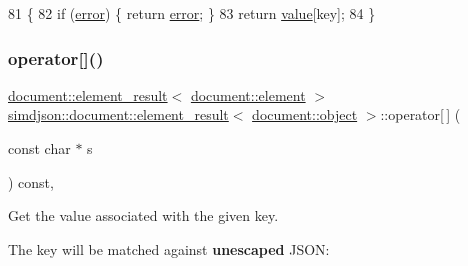\begin{DoxyCode}
81                                                                                                            
                                     \{
82   \textcolor{keywordflow}{if} (\hyperlink{classsimdjson_1_1document_1_1element__result_3_01document_1_1object_01_4_afb94302f28fe94b4eee922f4803abf86}{error}) \{ \textcolor{keywordflow}{return} \hyperlink{classsimdjson_1_1document_1_1element__result_3_01document_1_1object_01_4_afb94302f28fe94b4eee922f4803abf86}{error}; \}
83   \textcolor{keywordflow}{return} \hyperlink{classsimdjson_1_1document_1_1element__result_3_01document_1_1object_01_4_a65174f23d014d2e7d6ed87f42b60045a}{value}[key];
84 \}
\end{DoxyCode}
\mbox{\label{classsimdjson_1_1document_1_1element__result_3_01document_1_1object_01_4_a659bd57996f58b8c32278f07b7447266}} 
\subsubsection{\texorpdfstring{operator[]()}{operator[]()}\hspace{0.1cm}{\footnotesize\ttfamily [2/2]}}
{\footnotesize\ttfamily \hyperlink{classsimdjson_1_1document_1_1element__result}{document\+::element\+\_\+result}$<$ \hyperlink{classsimdjson_1_1document_1_1element}{document\+::element} $>$ \hyperlink{classsimdjson_1_1document_1_1element__result}{simdjson\+::document\+::element\+\_\+result}$<$ \hyperlink{classsimdjson_1_1document_1_1object}{document\+::object} $>$\+::operator\mbox{[}$\,$\mbox{]} (\begin{DoxyParamCaption}\item[{const char $\ast$}]{s }\end{DoxyParamCaption}) const\hspace{0.3cm}{\ttfamily [inline]}, {\ttfamily [noexcept]}}



Get the value associated with the given key. 

The key will be matched against {\bfseries unescaped} J\+S\+ON\+:

